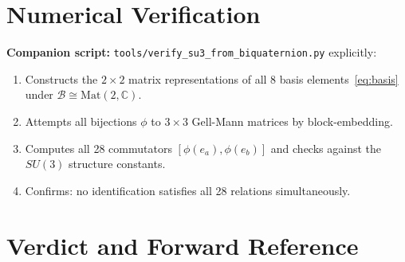 \documentclass[12pt,a4paper]{article}
\theoremstyle{definition}
\theoremstyle{remark}
\begin{document}
\section{Numerical Verification}
\label{sec:numerical}

\begin{insightbox}
\textbf{Companion script:}
\texttt{tools/verify\_su3\_from\_biquaternion.py} explicitly:
\begin{enumerate}
  \item Constructs the $2\times 2$ matrix representations of all 8 basis
        elements~\eqref{eq:basis} under $\mathcal{B} \cong \mathrm{Mat}(2,\mathbb{C})$.
  \item Attempts all bijections $\phi$ to $3\times 3$ Gell-Mann matrices
        by block-embedding.
  \item Computes all 28 commutators $[\phi(e_a), \phi(e_b)]$ and checks
        against the $SU(3)$ structure constants.
  \item Confirms: no identification satisfies all 28 relations simultaneously.
\end{enumerate}
\end{insightbox}

\section{Verdict and Forward Reference}
\label{sec:verdict}
\end{document}

